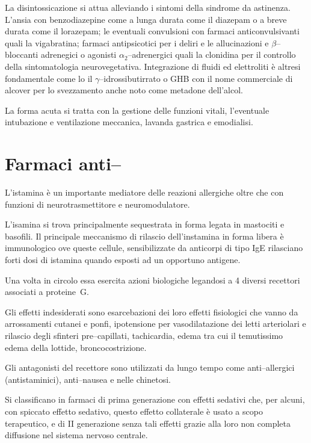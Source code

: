 La disintossicazione si attua alleviando i sintomi della sindrome da astinenza. L'ansia con benzodiazepine come a lunga durata come il diazepam o a breve durata come il lorazepam; le eventuali convulsioni con farmaci anticonvulsivanti quali la vigabratina; farmaci antipsicotici per i deliri e le allucinazioni e $\beta$--bloccanti adrenegici o agonisti $\alpha_2$--adrenergici quali la clonidina per il controllo della sintomatologia neurovegetativa. Integrazione di fluidi ed elettroliti è altresi fondamentale come lo il $\gamma$--idrossibutirrato o GHB con il nome commerciale di alcover per lo svezzamento anche noto come metadone dell'alcol.

La forma acuta si tratta con la gestione delle funzioni vitali, l'eventuale intubazione e ventilazione meccanica, lavanda gastrica e emodialisi.

\section{Farmaci anti--}

L'istamina è un importante mediatore delle reazioni allergiche oltre che con funzioni di neurotrasmettitore e neuromodulatore.

L'isamina si trova principalmente sequestrata in forma legata in mastociti e basofili. Il principale meccanismo di rilascio dell'instamina in forma libera è immunologico ove queste cellule, sensibilizzate da anticorpi di tipo IgE rilasciano forti dosi di istamina quando esposti ad un opportuno antigene.

Una volta in circolo essa esercita azioni biologiche legandosi a 4 diversi recettori  associati a proteine~G.

Gli effetti indesiderati sono esarcebazioni dei loro effetti fisiologici che vanno da arrossamenti cutanei e ponfi, ipotensione per vasodilatazione dei letti arteriolari e rilascio degli sfinteri pre--capillati, tachicardia, edema tra cui il temutissimo edema della lottide, broncocostrizione.

Gli antagonisti del recettore  sono utilizzati da lungo tempo come anti--allergici (antistaminici), anti--nausea e nelle chinetosi.

Si classificano in farmaci di prima generazione con effetti sedativi che, per alcuni, con spiccato effetto sedativo, questo effetto collaterale è usato a scopo terapeutico, e di II generazione senza tali effetti grazie alla loro non completa diffusione nel sistema nervoso centrale.

